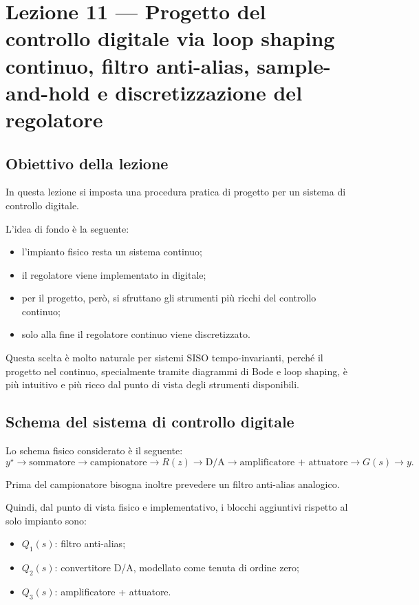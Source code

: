 \chapter{Lezione 11 --- Progetto del controllo digitale via loop shaping continuo, filtro anti-alias, sample-and-hold e discretizzazione del regolatore}

\section{Obiettivo della lezione}

In questa lezione si imposta una procedura pratica di progetto per un sistema di controllo digitale.

L'idea di fondo è la seguente:
\begin{itemize}
    \item l'impianto fisico resta un sistema continuo;
    \item il regolatore viene implementato in digitale;
    \item per il progetto, per\`o, si sfruttano gli strumenti pi\`u ricchi del controllo continuo;
    \item solo alla fine il regolatore continuo viene discretizzato.
\end{itemize}

Questa scelta \`e molto naturale per sistemi SISO tempo-invarianti, perch\'e il progetto nel continuo,
specialmente tramite diagrammi di Bode e loop shaping, \`e pi\`u intuitivo e pi\`u ricco
dal punto di vista degli strumenti disponibili.

\section{Schema del sistema di controllo digitale}

Lo schema fisico considerato \`e il seguente:
\[
y^\star \longrightarrow \text{sommatore} \longrightarrow \text{campionatore} \longrightarrow R(z)
\longrightarrow \text{D/A} \longrightarrow \text{amplificatore + attuatore}
\longrightarrow G(s) \longrightarrow y.
\]

Prima del campionatore bisogna inoltre prevedere un filtro anti-alias analogico.

Quindi, dal punto di vista fisico e implementativo, i blocchi aggiuntivi rispetto al solo impianto sono:
\begin{itemize}
    \item \textbf{\(Q_1(s)\)}: filtro anti-alias;
    \item \textbf{\(Q_2(s)\)}: convertitore D/A, modellato come tenuta di ordine zero;
    \item \textbf{\(Q_3(s)\)}: amplificatore + attuatore.
\end{itemize}

